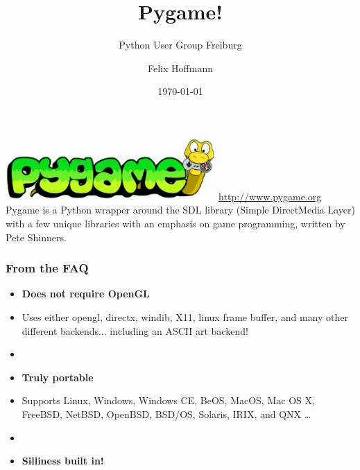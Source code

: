 \documentclass[handout]{beamer}   %
\title{Pygame!}
\subtitle{Python User Group Freiburg}
\author[Felix Hoffmann]{Felix Hoffmann}
\institute{\url{http://about.me/felixhoffmann}}
\date{\today}
\begin{document}






\begin{frame}[plain]
  \titlepage
\end{frame}




\begin{frame}[plain]
\begin{center}
\includegraphics[width=0.6\textwidth]{img/pygame.png}
\vspace{1cm}
\url{http://www.pygame.org}\\
\vspace{1.4cm}
Pygame is a Python wrapper around the SDL library (Simple DirectMedia Layer) with a few unique libraries with an emphasis on game programming, written by Pete Shinners.
\end{center}
\end{frame}


\begin{frame}

\frametitle{From the FAQ}

\begin{itemize}

\item[] \textbf{Does not require OpenGL} 
\item[] Uses either opengl, directx, windib, X11, linux frame buffer, and many other different backends... including an ASCII art backend!
\item[]
\item[] \textbf{Truly portable}
\item[] Supports Linux, Windows, Windows CE, BeOS, MacOS, Mac OS X, FreeBSD, NetBSD, OpenBSD, BSD/OS, Solaris, IRIX, and QNX \dots
\item[]
\item[] \textbf{Silliness built in!}
\end{itemize}
\end{frame}
\end{document}
